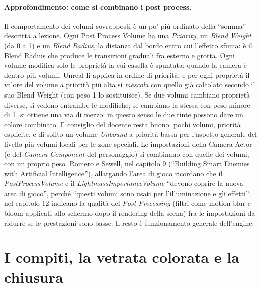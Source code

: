 \paragraph{Approfondimento: come si combinano i post process.} Il comportamento dei volumi
sovrapposti è un po' più ordinato della ``somma'' descritta a lezione. Ogni Post Process
Volume ha una \emph{Priority}, un \emph{Blend Weight} (da 0 a 1) e un \emph{Blend Radius}, la
distanza dal bordo entro cui l'effetto sfuma: è il Blend Radius che produce le transizioni
graduali fra esterno e grotta. Ogni volume modifica solo le proprietà la cui casella è
spuntata; quando la camera è dentro più volumi, Unreal li applica in ordine di priorità, e
per ogni proprietà il valore del volume a priorità più alta si \emph{mescola} con quello già
calcolato secondo il suo Blend Weight (con peso 1 lo sostituisce). Se due volumi cambiano
proprietà diverse, si vedono entrambe le modifiche; se cambiano la stessa con peso minore di
1, si ottiene una via di mezzo: in questo senso le due tinte possono dare un colore
combinato. Il consiglio del docente resta buono: pochi volumi, priorità esplicite, e di solito
un volume \emph{Unbound} a priorità bassa per l'aspetto generale del livello più volumi locali
per le zone speciali. Le impostazioni della Camera Actor (e del \emph{Camera Component} del
personaggio) si combinano con quelle dei volumi, con un proprio peso. Romero e Sewell, nel
capitolo 9 (``Building Smart Enemies with Artificial Intelligence''), allargando l'area di
gioco ricordano che il \emph{PostProcessVolume} e il \emph{LightmassImportanceVolume} ``devono
coprire la nuova area di gioco'', perché ``questi volumi sono usati per l'illuminazione e gli
effetti''; nel capitolo 12 indicano la qualità del \emph{Post Processing} (filtri come motion
blur e bloom applicati allo schermo dopo il rendering della scena) fra le impostazioni da
ridurre se le prestazioni sono basse. Il resto è funzionamento generale dell'engine.

\section{I compiti, la vetrata colorata e la chiusura}
\label{ue15:sec:chiusura}

